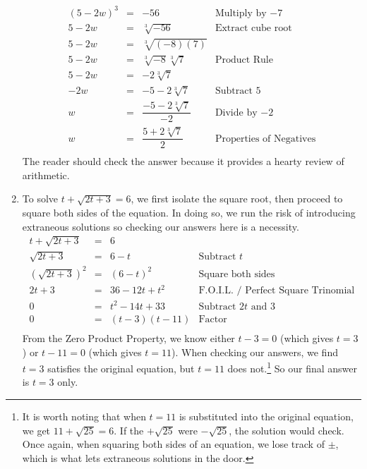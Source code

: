 \documentclass{ximera}
\begin{document}
\begin{example}
\begin{enumerate}
\[\begin{array}{rclr}
(5-2w) ^ 3 & = & -56 & \text{Multiply by $-7$} \\[2pt]

5 - 2w & = & \sqrt[3]{-56} & \text{Extract cube root} \\[2pt]

5 - 2w & = & \sqrt[3]{(-8)(7)} & \\[2pt]

5 - 2w & = & \sqrt[3]{-8} \sqrt[3]{7} & \text{Product Rule}\\[2pt]

5 - 2w & = & -2\sqrt[3]{7} & \\[2pt]

-2w & = & -5-2 \sqrt[3]{7} & \text{Subtract $5$} \\[2pt]

w & = & \dfrac{-5 - 2\sqrt[3]{7}}{-2} & \text{Divide by $-2$} \\[8pt]

w & = & \dfrac{5 + 2\sqrt[3]{7}}{2} & \text{Properties of Negatives} \\

\end{array}\] The reader should check the answer because it provides a hearty review of arithmetic.

\item  To solve  $t + \sqrt{2t+3} = 6$, we first isolate the square root, then proceed to square both sides of the equation.  In doing so, we run the risk of introducing extraneous solutions so checking our answers here is a necessity. \[ \begin{array}{rclr}

t + \sqrt{2t+3}  & = & 6 & \\ [2pt]

\sqrt{2t+3} & = & 6 - t & \text{Subtract $t$} \\ [2pt]

(\sqrt{2t+3})^2 & = & (6-t)^2 & \text{Square both sides} \\ [2pt]

2t + 3 & = & 36-12t + t^2 & \text{F.O.I.L. / Perfect Square Trinomial} \\ [2pt]

0 & = & t^2 - 14t + 33 & \text{Subtract $2t$ and $3$} \\ [2pt]

0 & = & (t-3)(t-11) & \text{Factor} \\ \end{array} \] From the Zero Product Property, we know either $t - 3 = 0$ (which gives $t=3$) or $t-11 = 0$ (which gives $t=11$).  When checking our answers, we find $t = 3$ satisfies the original equation, but $t = 11$ does not.\footnote{It is worth noting that when $t=11$ is substituted into the original equation, we get $11 + \sqrt{25} = 6$.  If the $+\sqrt{25}$ were $-\sqrt{25}$, the solution would check. Once again, when squaring both sides of an equation, we lose track of $\pm$, which is what lets extraneous solutions in the door.}  So our final answer is $t = 3$ only.


\end{enumerate}
\end{example}
\end{document}
